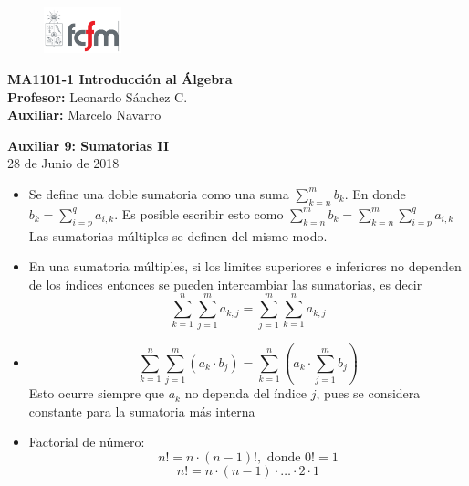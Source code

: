 \documentclass[letterpaper,11pt]{article}
\theoremstyle{plain}
\begin{document}
\newpage
\pagestyle{fancy}
\fancyhf{}

\begin{figure} %
    \vspace{-5mm}
    \includegraphics[width=0.2\textwidth]{img/fcfm2.png}
\end{figure}


\noindent
\textbf{MA1101-1 Introducción al Álgebra}\\
\textbf{Profesor: }Leonardo Sánchez C.\\
\textbf{Auxiliar: }Marcelo Navarro

\begin{center}
{\bf \Large Auxiliar 9: Sumatorias II}\\
{28 de Junio de 2018}
\end{center}

\begin{framed}
	\begin{multicols}{2}
	    \begin{itemize}  
            \item Se define una doble sumatoria como una suma $\displaystyle \sum_{k=n}^{m} b_{k}$. En donde $\displaystyle b_k=\sum_{i=p}^{q}a_{i,k}$. Es posible escribir esto como $\displaystyle \sum_{k=n}^{m} b_{k}=\sum_{k=n}^{m}\sum_{i=p}^{q}a_{i,k}$\\
            Las sumatorias múltiples se definen del mismo modo.
    
            \item En una sumatoria múltiples, si los limites superiores e inferiores no dependen de los índices entonces se pueden intercambiar las sumatorias, es decir
            $$\displaystyle \sum_{k=1}^{n}\sum_{j=1}^{m}a_{k,j}=\sum_{j=1}^{m}\sum_{k=1}^{n}a_{k,j}$$
    
            \item $$\displaystyle \sum_{k=1}^{n}\sum_{j=1}^{m}(a_{k}\cdot b_{j})= \sum_{k=1}^{n}(a_{k}\cdot \sum_{j=1}^{m} b_{j}) $$
            Esto ocurre siempre que $a_{k}$ no dependa del índice $j$, pues se considera constante para la sumatoria más interna
            
            \item Factorial de número:
                $$n!=n\cdot (n-1)! , \text{ donde } 0!=1$$
                $$n!=n\cdot(n-1)\cdot \dots \cdot 2\cdot 1  $$
        \end{itemize}
    \end{multicols}
\end{framed}
\end{document}
